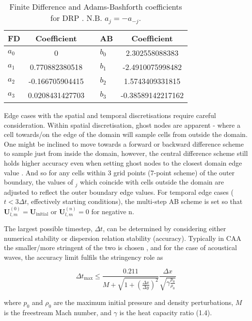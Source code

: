\begin{table}[h]
    \centering
    \caption{Finite Difference and Adams-Bashforth coefficients for DRP \cite{tam193DRP}. N.B. $a_j=-a_{-j}$.}
    \begin{tabular}{lcllc}
        \hline \hline
        \textbf{FD} & \textbf{Coefficient} & & \textbf{AB} & \textbf{Coefficient} \\
        \hline
        $a_0$ & 0 & & $b_0$ & 2.302558088383 \\
        $a_1$ & 0.770882380518 & & $b_1$ & -2.4910075998482 \\
        $a_2$ & -0.166705904415 & & $b_2$ & 1.5743409331815 \\
        $a_3$ & 0.0208431427703 & & $b_3$ & -0.38589142217162 \\
        \hline \hline
    \end{tabular}
    \label{tab:FDABCoeffs}
\end{table}

Edge cases with the spatial and temporal discretisations require careful consideration. Within spatial discretisation, ghost nodes are apparent - where a cell towards/on the edge of the domain will sample cells from outside the domain. One might be inclined to move towards a forward or backward difference scheme to sample just from inside the domain, however, the central difference scheme still holds higher accuracy even when setting ghost nodes to the closest domain edge value \cite{kopecky2007numericaldiff} \cite{nedialkov2015forwardbackward}. And so for any cells within 3 grid points (7-point scheme) of the outer boundary, the values of $_{j}$ which coincide with cells outside the domain are adjusted to reflect the outer boundary edge values. For temporal edge cases ($t<3\Delta t$, effectively starting conditions), the multi-step AB scheme is set so that $\mathbf{U}^{\left(0\right)}_{l,m}=\mathbf{U}_{\mathrm{initial}}$ or $\mathbf{U}^{\left(n\right)}_{l,m}=0$ for negative n.


The largest possible timestep, $\Delta t$, can be determined by considering either numerical stability or dispersion relation stability (accuracy). Typically in CAA the smaller/more stringent of the two is chosen \cite{tam2012computational}, and for the case of acoustical waves, the accuracy limit fulfils the stringency role as

\begin{equation} \label{eq:Timestep}
    \Delta t_{\mathrm{max}} \leq \frac{0.211}{  M + \sqrt{1 + \left(\frac{\Delta x}{\Delta y}\right)^2}} \frac{\Delta x}{\sqrt{\gamma \frac{p_0}{\rho_0}}}
\end{equation}

where $p_0$ and $\rho_0$ are the maximum initial pressure and density perturbations, $M$ is the freestream Mach number, and $\gamma$ is the heat capacity ratio (1.4).